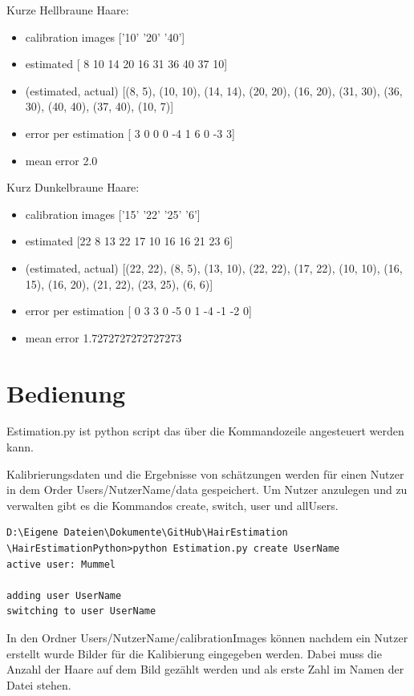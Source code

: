 \documentclass[german,a4paper, 12pt]{llncs}
\begin{document}
Kurze Hellbraune Haare: 

\begin{itemize}
	\item calibration images ['10' '20' '40']
	\item estimated [ 8 10 14 20 16 31 36 40 37 10]
	\item (estimated, actual)
	[(8, 5), (10, 10), (14, 14), (20, 20), (16, 20), (31, 30), (36, 30), (40, 40), (37, 40), (10, 7)]
	\item error per estimation [ 3  0  0  0 -4  1  6  0 -3  3]
	\item mean error 2.0
\end{itemize}

Kurz Dunkelbraune Haare:
\begin{itemize}
	\item calibration images ['15' '22' '25' '6']
	\item estimated [22  8 13 22 17 10 16 16 21 23  6]
	\item (estimated, actual) [(22, 22), (8, 5), (13, 10), (22, 22), (17, 22), (10, 10), (16, 15), (16, 20), (21, 22), (23, 25), (6, 6)]
	\item error per estimation [ 0  3  3  0 -5  0  1 -4 -1 -2  0]
	\item mean error 1.7272727272727273
\end{itemize}


\section{Bedienung}
\label{appendix:bedienung}

Estimation.py ist python script das über die Kommandozeile angesteuert werden kann.

Kalibrierungsdaten und die Ergebnisse von schätzungen werden für einen Nutzer in dem Order Users/NutzerName/data gespeichert.
Um Nutzer anzulegen und zu verwalten gibt es die Kommandos create, switch, user und allUsers. 

\begin{lstlisting}[style=DOS]
D:\Eigene Dateien\Dokumente\GitHub\HairEstimation
\HairEstimationPython>python Estimation.py create UserName
active user: Mummel

adding user UserName
switching to user UserName
\end{lstlisting}

In den Ordner Users/NutzerName/calibrationImages können nachdem ein Nutzer erstellt wurde Bilder für die Kalibierung eingegeben werden. Dabei muss die Anzahl der Haare auf dem Bild gezählt werden und als erste Zahl im Namen der Datei stehen.
\end{document}
